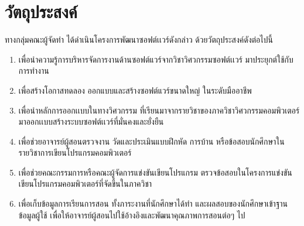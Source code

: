 \documentclass[12pt,oneside,openright,a4paper]{cpe-thai-project}
\begin{document}
\section{วัตถุประสงค์}
    ทางกลุ่มคณะผู้จัดทำ ได้ดำเนินโครงการพัฒนาซอฟต์เเวร์ดังกล่าว ด้วยวัตถุประสงค์ดังต่อไปนี้
    \begin{enumerate}
        \item เพื่อนำความรู้การบริหารจัดการงานด้านซอฟต์แวร์จากวิชาวิศวกรรมซอฟต์เเวร์ มาประยุกต์ใช้กับการทำงาน
        \item เพื่อสร้างโอกาสทดลอง ออกแบบและสร้างซอฟต์แวร์ขนาดใหญ่ ในระดับมืออาชีพ 
        \item เพื่อนำหลักการออกเเบบในทางวิศวกรรม ที่เรียนมาจากรายวิชาของภาควิชาวิศวกรรมคอมพิวเตอร์ มาออกเเบบสร้างระบบซอฟต์เเวร์ที่มั่นคงและยั่งยืน
        \item เพื่อช่วยอาจารย์ผู้สอนตรวจงาน วัดและประเมินแบบฝึกหัด การบ้าน หรือข้อสอบนักศึกษาในรายวิชาการเขียนโปรแกรมคอมพิวเตอร์ 
        \item เพื่อช่วยคณะกรรมการหรือคณะผู้จัดการแข่งขันเขียนโปรแกรม ตรวจข้อสอบในโครงการแข่งขันเขียนโปรแกรมคอมพิวเตอร์ที่จัดขึ้นในภาควิชา 
        \item เพื่อเก็บข้อมูลการเรียนการสอน ทั้งภาระงานที่นักศึกษาได้ทำ และผลสอบของนักศึกษาเข้าฐานข้อมูลผู้ใช้ เพื่อให้อาจารย์ผู้สอนไปใช้อ้างอิงและพัฒนาคุณภาพการสอนต่อๆ ไป
    \end{enumerate}
\end{document}
